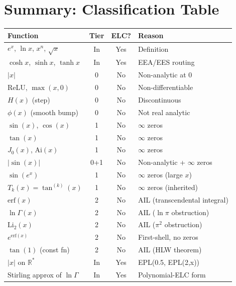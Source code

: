 \documentclass[11pt]{article}
\begin{document}
\section{Summary: Classification Table}

\begin{center}
\renewcommand{\arraystretch}{1.2}
\begin{tabular}{lccl}
\toprule
Function & Tier & ELC? & Reason \\
\midrule
$e^x$, $\ln x$, $x^n$, $\sqrt{x}$ & In & Yes & Definition \\
$\cosh x$, $\sinh x$, $\tanh x$ & In & Yes & EEA/EES routing \\
$|x|$ & 0 & No & Non-analytic at $0$ \\
ReLU, $\max(x,0)$ & 0 & No & Non-differentiable \\
$H(x)$ (step) & 0 & No & Discontinuous \\
$\phi(x)$ (smooth bump) & 0 & No & Not real analytic \\
$\sin(x)$, $\cos(x)$ & 1 & No & $\infty$ zeros \\
$\tan(x)$ & 1 & No & $\infty$ zeros \\
$J_0(x)$, $\mathrm{Ai}(x)$ & 1 & No & $\infty$ zeros \\
$|\sin(x)|$ & 0+1 & No & Non-analytic + $\infty$ zeros \\
$\sin(e^x)$ & 1 & No & $\infty$ zeros (large $x$) \\
$T_k(x)=\tan^{(k)}(x)$ & 1 & No & $\infty$ zeros (inherited) \\
$\mathrm{erf}(x)$ & 2 & No & AIL (transcendental integral) \\
$\ln\Gamma(x)$ & 2 & No & AIL ($\ln\pi$ obstruction) \\
$\mathrm{Li}_2(x)$ & 2 & No & AIL ($\pi^2$ obstruction) \\
$e^{\mathrm{erf}(x)}$ & 2 & No & First-shell, no zeros \\
$\tan(1)$ (const fn) & 2 & No & AIL (HLW theorem) \\
$|x|$ on $\mathbb{R}^*$ & In & Yes & EPL(0.5, EPL(2,x)) \\
Stirling approx of $\ln\Gamma$ & In & Yes & Polynomial-ELC form \\
\bottomrule
\end{tabular}
\end{center}
\end{document}
